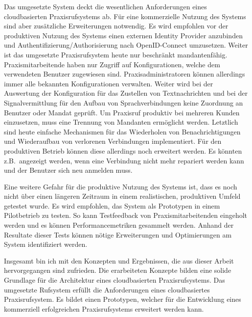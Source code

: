 Das umgesetzte System deckt die wesentlichen Anforderungen eines cloudbasierten Praxisrufsystems ab.
Für eine kommerzielle Nutzung des Systems sind aber zusätzliche Erweiterungen notwendig.
Es wird empfohlen vor der produktiven Nutzung des Systems einen externen Identity Provider anzubinden und Authentifizierung/Authorisierung nach OpenID-Connect umzusetzen.
Weiter ist das umgesetzte Praxisrufsystem heute nur beschränkt mandantenfähig.
Praxismitarbeitende haben nur Zugriff auf Konfigurationen, welche dem verwendeten Benutzer zugewiesen sind.
Praxisadministratoren können allerdings immer alle bekannten Konfigurationen verwalten.
Weiter wird bei der Auswertung der Konfiguration für das Zustellen von Textnachrichten und bei der Signalvermittlung für den Aufbau von Sprachverbindungen keine Zuordnung an Benutzer oder Mandat geprüft.
Um Praxisruf produktiv bei mehreren Kunden einzusetzen, muss eine Trennung von Mandanten ermöglicht werden.
Letztlich sind heute einfache Mechanismen für das Wiederholen von Benachrichtigungen und Wiederaufbau von verlorenen Verbindungen implementiert.
Für den produktiven Betrieb können diese allerdings noch erweitert werden.
Es könnten z.B.\ angezeigt werden, wenn eine Verbindung nicht mehr repariert werden kann und der Benutzer sich neu anmelden muss.

Eine weitere Gefahr für die produktive Nutzung des Systems ist, dass es noch nicht über einen längeren Zeitraum in einem realistischen, produktiven Umfeld getestet wurde.
Es wird empfohlen, das System als Prototypen in einem Pilotbetrieb zu testen.
So kann Testfeedback von Praxismitarbeitenden eingeholt werden und es können Performancemetriken gesammelt werden.
Anhand der Resultate dieser Tests können nötige Erweiterungen und Optimierungen am System identifiziert werden.

Insgesamt bin ich mit den Konzepten und Ergebnissen, die aus dieser Arbeit hervorgegangen sind zufrieden.
Die erarbeiteten Konzepte bilden eine solide Grundlage für die Architektur eines cloudbasierten Praxisrufsystems.
Das umgesetzte Rufsystem erfüllt die Anforderungen eines cloudbasiertes Praxisrufsystem.
Es bildet einen Prototypen, welcher für die Entwicklung eines kommerziell erfolgreichen Praxisrufsystems erweitert werden kann.

\clearpage
